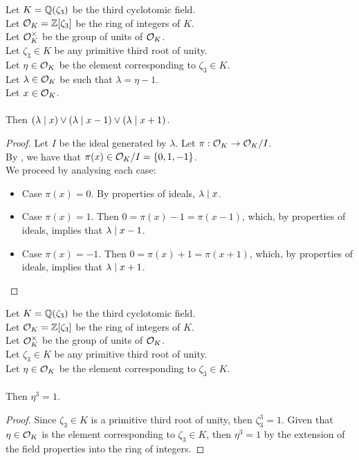\begin{lemma}
    \label{lmm:dvd_or_dvd_sub_one_or_dvd_add_one}
    \leanok
    Let $K = \mathbb{Q}(\zeta_3)$ be the third cyclotomic field. \\
    Let $\mathcal{O}_K = \mathbb{Z}[\zeta_3]$ be the ring of integers of $K$. \\
    Let $\mathcal{O}^\times_K$ be the group of units of $\mathcal{O}_K$. \\
    Let $\zeta_3 \in K$ be any primitive third root of unity. \\
    Let $\eta \in \mathcal{O}_K$ be the element corresponding to $\zeta_3 \in K$. \\
    Let $\lambda \in \mathcal{O}_K$ be such that $\lambda = \eta -1$. \\
    Let $x \in \mathcal{O}_K$. \\\\
    Then $(\lambda \mid x) \lor (\lambda \mid x-1) \lor (\lambda \mid x+1)$.
\end{lemma}
\begin{proof}
    \leanok
    Let $I$ be the ideal generated by $\lambda$. Let $\pi : \mathcal{O}_K \to \mathcal{O}_K / I$.\\
    By , we have that $\pi(x) \in \mathcal{O}_K / I = \left\{0, 1, -1\right\}$.\\
    We proceed by analysing each case:
    \begin{itemize}
        \item Case $\pi(x) = 0$. By properties of ideals, $\lambda \mid x$.
        \item Case $\pi(x) = 1$. Then $0=\pi(x)-1=\pi(x-1)$, which, by properties of ideals,
        implies that $\lambda \mid x-1$.
        \item Case $\pi(x) = -1$. Then $0=\pi(x)+1=\pi(x+1)$, which, by properties of ideals,
        implies that $\lambda \mid x+1$.
    \end{itemize}
\end{proof}

\begin{lemma}
    \label{lmm:toInteger_cube_eq_one}
    \leanok
    Let $K = \mathbb{Q}(\zeta_3)$ be the third cyclotomic field. \\
    Let $\mathcal{O}_K = \mathbb{Z}[\zeta_3]$ be the ring of integers of $K$. \\
    Let $\mathcal{O}^\times_K$ be the group of units of $\mathcal{O}_K$. \\
    Let $\zeta_3 \in K$ be any primitive third root of unity. \\
    Let $\eta \in \mathcal{O}_K$ be the element corresponding to $\zeta_3 \in K$. \\\\
    Then $\eta^3 = 1$.
\end{lemma}
\begin{proof}
    \leanok
    Since $\zeta_3 \in K$ is a primitive third root of unity, then $\zeta_3^3 = 1$.
    Given that $\eta \in \mathcal{O}_K$ is the element corresponding to $\zeta_3 \in K$, then
    $\eta^3 = 1$ by the extension of the field properties into the ring of integers.
\end{proof}

